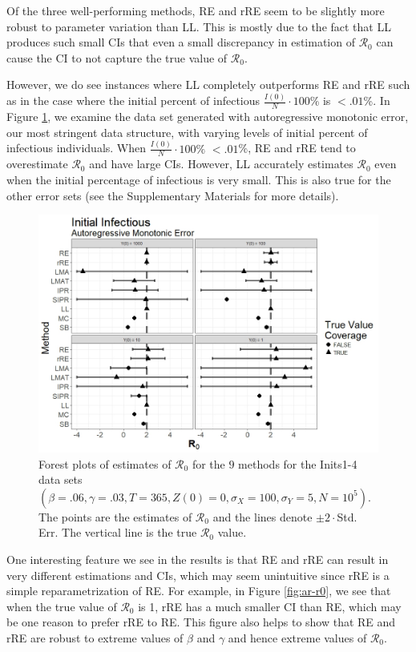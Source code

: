 \documentclass[12pt]{article}
\newcommand{\xxsir}{\ensuremath{9} } %
\newcommand{\rr}{\ensuremath{\mathcal{R}_0}}
\begin{document}
Of the three well-performing methods, RE and rRE seem to be slightly more robust to parameter variation than LL.  This is mostly due to the fact that LL produces such small CIs that even a small discrepancy in estimation of $\rr$ can cause the CI to not capture the true value of $\rr$.

However, we do see instances where LL completely outperforms RE and rRE such as in the case where the initial percent of infectious $\frac{I(0)}{N} \cdot 100\%$ is $< .01$\%. In Figure \ref{fig:ar-small-I}, we examine the data set generated with autoregressive monotonic error, our most stringent data structure, with varying levels of initial percent of infectious individuals.  When $\frac{I(0)}{N} \cdot 100\%$ $< .01$\%, RE and rRE tend to overestimate $\rr$ and have large CIs.  However, LL accurately estimates $\rr$ even when the initial percentage of infectious is very small.  This is also true for the other error sets (see the Supplementary Materials for more details).

\begin{figure}[H]
	\centering
	\includegraphics[scale=0.5]{images/start_arm.jpeg}
	\caption{Forest plots of estimates of $\rr$ for the \xxsir methods for the Inits1-4 data sets $(\beta=.06, \gamma=.03, T=365,  Z(0)=0, \sigma_X=100, \sigma_Y=5, N=10^5)$.  The points are the estimates of $\rr$ and the lines denote $\pm 2\cdot $Std. Err.  The vertical line is the true $\rr$ value.}\label{fig:ar-small-I}
\end{figure}

One interesting feature we see in the results is that RE and rRE can result in very different estimations and CIs, which may seem unintuitive since rRE is a simple reparametrization of RE.  For example, in Figure \ref{fig:ar-r0}, we see that when the true value of $\rr$ is 1, rRE has a much smaller CI than RE, which may be one reason to prefer rRE to RE.  This figure also helps to show that RE and rRE are robust to extreme values of $\beta$ and $\gamma$ and hence extreme values of $\rr$.
\end{document}
